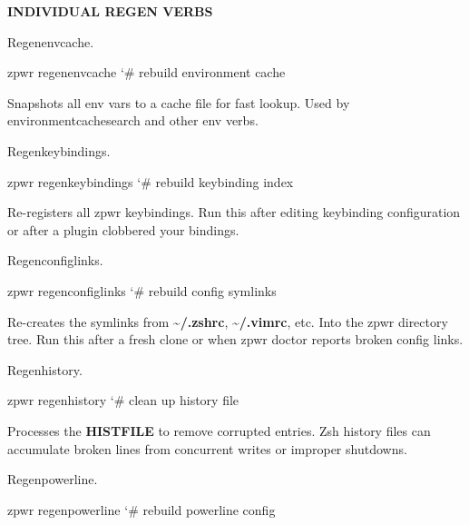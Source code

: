 \documentclass[11pt,a4paper,twoside]{book}
\begin{document}
\vspace{12pt}
{\bfseries\color{neonyellow} INDIVIDUAL REGEN VERBS}\vspace{4pt}

Regenenvcache.

\begin{codebox}
\color{neongreen}zpwr regenenvcache                  {\char`\#} rebuild environment cache\\
\end{codebox}

Snapshots all env vars to a cache file for fast lookup. Used by environmentcachesearch and other env verbs.

Regenkeybindings.

\begin{codebox}
\color{neongreen}zpwr regenkeybindings               {\char`\#} rebuild keybinding index\\
\end{codebox}

Re-registers all zpwr keybindings. Run this after editing keybinding configuration or after a plugin clobbered your bindings.

Regenconfiglinks.

\begin{codebox}
\color{neongreen}zpwr regenconfiglinks               {\char`\#} rebuild config symlinks\\
\end{codebox}

Re-creates the symlinks from \textbf{\textasciitilde{}/.zshrc}, \textbf{\textasciitilde{}/.vimrc}, etc. Into the zpwr directory tree. Run this after a fresh clone or when zpwr doctor reports broken config links.

Regenhistory.

\begin{codebox}
\color{neongreen}zpwr regenhistory                   {\char`\#} clean up history file\\
\end{codebox}

Processes the \textbf{HISTFILE} to remove corrupted entries. Zsh history files can accumulate broken lines from concurrent writes or improper shutdowns.

Regenpowerline.

\begin{codebox}
\color{neongreen}zpwr regenpowerline                 {\char`\#} rebuild powerline config\\
\end{codebox}
\end{document}
